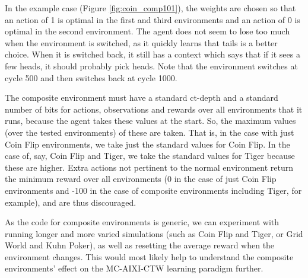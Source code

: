 \documentclass[pdftex,twoside,a4paper]{report}
\newcommand{\mac}{MC-AIXI-CTW}
\begin{document}
In the example case (Figure \ref{fig:coin_comp101}), the weights are chosen so that an action of 1 is optimal in the first and third environments and an action of 0 is optimal in the second environment. The agent does not seem to lose too much when the environment is switched, as it quickly learns that tails is a better choice. When it is switched back, it still has a context which says that if it sees a few heads, it should probably pick heads. Note that the environment switches at cycle 500 and then switches back at cycle 1000.

The composite environment must have a standard ct-depth and a standard number of bits for actions, observations and rewards over all environments that it runs, because the agent takes these values at the start. So, the maximum values (over the tested environments) of these are taken. That is, in the case with just Coin Flip environments, we take just the standard values for Coin Flip. In the case of, say, Coin Flip and Tiger, we take the standard values for Tiger because these are higher. Extra actions not pertinent to the normal environment return the minimum reward over all environments (0 in the case of just Coin Flip environments and -100 in the case of composite environments including Tiger, for example), and are thus discouraged.

As the code for composite environments is generic, we can experiment with running longer and more varied simulations (such as Coin Flip and Tiger, or Grid World and Kuhn Poker), as well as resetting the average reward when the environment changes. This would most likely help to understand the composite environments' effect on the \mac{} learning paradigm further.



\end{document}

